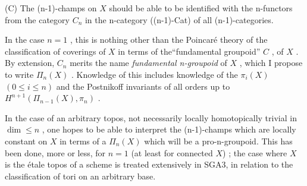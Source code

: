 (C) The (n-1)-champs on $X$ should be able to be identified with the
n-functors from the category $C_{n}$ in the n-category ((n-1)-Cat) of all
(n-1)-categories.

In the case $n = 1$ , this is nothing other than the Poincaré theory of
the classification of coverings of $X$ in terms of the``fundamental groupoid''
$C$ , of $X$ . By extension, $C_{n}$ merits the name \textit{fundamental n-groupoid} of $X$ ,
which I propose to write $\Pi_{n}(X)$ . Knowledge of this includes knowledge of
the $\pi_{i}(X)$ $(0 \leq i \leq n)$ and the Postnikoff invariants of all orders up to
$H^{n+1}(\Pi_{n-1}(X), \pi_{n})$ .

In the case of an arbitrary topos, not necessarily locally homotopically
trivial in $\dim \leq n$ , one hopes to be able to interpret the (n-1)-champs which
are locally constant on $X$ in terms of a $\Pi_{n}(X)$ which will be a pro-n-groupoid.
This has been done, more or less, for $n = 1$ (at least for connected $X$) ;
the case where $X$ is the étale topos of a scheme is treated extensively in
SGA3, in relation to the classification of tori on an arbitrary base.

